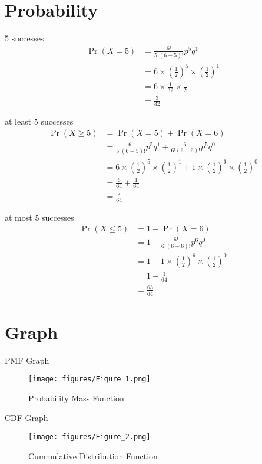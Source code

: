 \documentclass{beamer}
\providecommand{\pr}[1]{\ensuremath{\Pr\left(#1\right)}}
\providecommand{\pr}[1]{\ensuremath{\Pr\left(#1\right)}}
\providecommand{\brak}[1]{\ensuremath{\left(#1\right)}}
\begin{document}
\section{Probability}
\begin{frame}{5 successes}
\begin{align}
    \pr{X=5} &= \frac{6!}{5! (6-5)!}p^5q^{1} \\
    &= 6 \times \brak{\frac{1}{2}}^{5} \times \brak{\frac{1}{2}}^{1}\\
    &= 6 \times \frac{1}{32} \times \frac{1}{2}\\
    &= \frac{3}{32}
\end{align}

\end{frame}
\begin{frame}{at least 5 successes}
\begin{align}
    \pr{X\geq5} &= \pr{X=5} + \pr{X=6}\\
    &= \frac{6!}{5! (6-5)!}p^5q^{1} + \frac{6!}{6! (6-6)!}p^5q^{0}\\
    &= 6 \times \brak{\frac{1}{2}}^{5} \times \brak{\frac{1}{2}}^{1} + 1 \times \brak{\frac{1}{2}}^{6} \times \brak{\frac{1}{2}}^{0}\\
    &= \frac{6}{64} + \frac{1}{64}\\
    &= \frac{7}{64}
\end{align}

\end{frame}
\begin{frame}{at most 5 successes}
\begin{align}
    \pr{X\leq5} &= 1 - \pr{X=6}\\
    &= 1 - \frac{6!}{6! (6-6)!}p^6q^{0} \\
    &= 1 -  1 \times \brak{\frac{1}{2}}^{6} \times \brak{\frac{1}{2}}^{0}\\
    &= 1 -  \frac{1}{64}\\
    &= \frac{63}{64}
\end{align}
\end{frame}

\section{Graph}
\begin{frame}{PMF Graph}
\begin{figure}[!ht]
		\centering
		\texttt{[image: figures/Figure\_1.png]}
		\caption{Probability Mass Function}
		\label{fig1}
	\end{figure}
\end{frame}

\begin{frame}{CDF Graph}
\begin{figure}[!ht]
		\centering
		\texttt{[image: figures/Figure\_2.png]}
		\caption{Cummulative Distribution Function}
		\label{fig1}
	\end{figure}
\end{frame}
\end{document}
